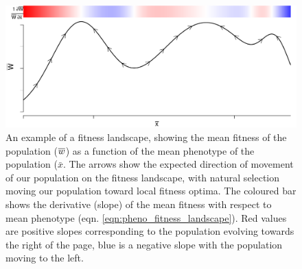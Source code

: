  \begin{figure}
 \begin{center}
 \includegraphics[width= 0.8 \textwidth]{figures/Response_to_sel/fitness_landscape_1D.pdf}
 \end{center}
 \caption{An example of a fitness landscape, showing the mean fitness
   of the population ($\overline{w}$) as a function of the mean phenotype of the
   population ($\bar{x}$. The arrows show the expected direction of movement
of our population on the fitness landscape, with natural selection moving
our population toward local fitness optima. The coloured bar shows the
derivative (slope) of the mean fitness with respect to mean
phenotype (eqn. \eqref{eqn:pheno_fitness_landscape}). Red values are positive slopes corresponding to the population evolving
towards the right of the page, blue is a negative slope with the
population moving to the left. } \label{fig:fitness_landscape_1D}  
\end{figure}

